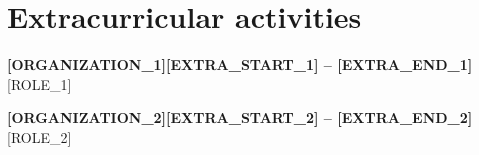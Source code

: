 \documentclass[letterpaper,10pt]{article}
\newcommand{\heading}[2]{
  \hspace{10pt}#1\hfill#2\\
}
\newcommand{\headingBf}[2]{
  \heading{\textbf{#1}}{\textbf{#2}}
}
\newcommand{\subtext}[1]{
  \hspace{10pt}#1
}
\newenvironment{resume_list}{
  \vspace{-7pt}
  \begin{itemize}[itemsep=2pt, parsep=1pt, leftmargin=30pt]
}{
  \end{itemize}
}
\begin{document}
  \section{Extracurricular activities}

  \headingBf{[ORGANIZATION_1]}{[EXTRA_START_1] -- [EXTRA_END_1]}
  \subtext{[ROLE_1]}
    \begin{resume_list}
      \item [EXTRA_DESCRIPTION_1]
  \end{resume_list}
    \headingBf{[ORGANIZATION_2]}{[EXTRA_START_2] -- [EXTRA_END_2]}
  \subtext{[ROLE_2]}
    \begin{resume_list}
      \item [EXTRA_DESCRIPTION_2]
  \end{resume_list}


\end{document}
